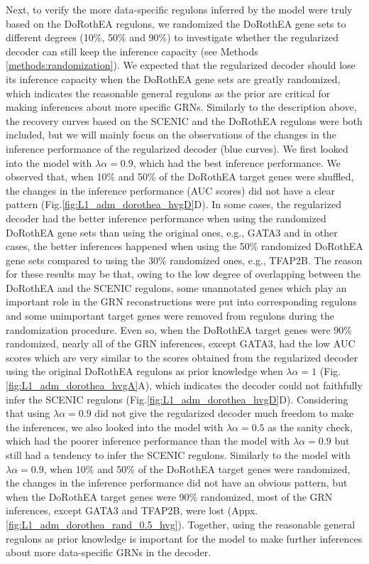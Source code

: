 Next, to verify the more data-specific regulons inferred by the model were truly based on the DoRothEA regulons, we randomized the DoRothEA gene sets to different degrees (10\%, 50\% and 90\%) to investigate whether the regularized decoder can still keep the inference capacity (see Methods \ref{methods:randomization}). We expected that the regularized decoder should lose its inference capacity when the DoRothEA gene sets are greatly randomized, which indicates the reasonable general regulons as the prior are critical for making inferences about more specific GRNs. Similarly to the description above, the recovery curves based on the SCENIC and the DoRothEA regulons were both included, but we will mainly focus on the observations of the changes in the inference performance of the regularized decoder (blue curves). We first looked into the model with $\lambda\alpha = 0.9$, which had the best inference performance. We observed that, when 10\% and 50\% of the DoRothEA target genes were shuffled, the changes in the inference performance (AUC scores) did not have a clear pattern (Fig.\ref{fig:L1_adm_dorothea_hvgD}D). In some cases, the regularized decoder had the better inference performance when using the randomized DoRothEA gene sets than using the original ones, e.g., GATA3 and in other cases, the better inferences happened when using the 50\% randomized DoRothEA gene sets compared to using the 30\% randomized ones, e.g., TFAP2B. The reason for these results may be that, owing to the low degree of overlapping between the DoRothEA and the SCENIC regulons, some unannotated genes which play an important role in the GRN reconstructions were put into corresponding regulons and some unimportant target genes were removed from regulons during the randomization procedure. Even so, when the DoRothEA target genes were 90\% randomized, nearly all of the GRN inferences, except GATA3, had the low AUC scores which are very similar to the scores obtained from the regularized decoder using the original DoRothEA regulons as prior knowledge when $\lambda\alpha = 1$ (Fig.\ref{fig:L1_adm_dorothea_hvgA}A), which indicates the decoder could not faithfully infer the SCENIC regulons (Fig.\ref{fig:L1_adm_dorothea_hvgD}D). Considering that using $\lambda\alpha = 0.9$ did not give the regularized decoder much freedom to make the inferences, we also looked into the model with $\lambda\alpha = 0.5$ as the sanity check, which had the poorer inference performance than the model with $\lambda\alpha = 0.9$ but still had a tendency to infer the SCENIC regulons. Similarly to the model with $\lambda\alpha = 0.9$, when 10\% and 50\% of the DoRothEA target genes were randomized, the changes in the inference performance did not have an obvious pattern, but when the DoRothEA target genes were 90\% randomized, most of the GRN inferences, except GATA3 and TFAP2B, were lost (Appx.\ref{fig:L1_adm_dorothea_rand_0.5_hvg}). Together, using the reasonable general regulons as prior knowledge is important for the model to make further inferences about more data-specific GRNs in the decoder.

